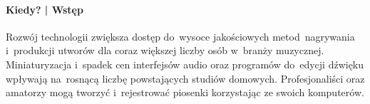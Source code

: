 \documentclass[12pt]{article}
\begin{document}





\paragraph{Kiedy? | Wstęp}

Rozwój technologii zwiększa dostęp do~wysoce jakościowych metod~nagrywania i~produkcji utworów dla coraz większej liczby osób w~branży muzycznej.
Miniaturyzacja i~spadek cen interfejsów audio oraz programów do~edycji dźwięku wpływają na~rosnącą liczbę powstających studiów domowych.
Profesjonaliści oraz amatorzy mogą tworzyć i~rejestrować piosenki korzystając ze swoich komputerów.
\end{document}
